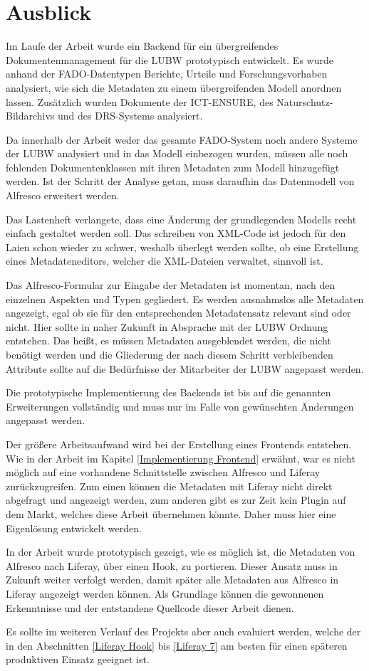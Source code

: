 \section{Ausblick}
Im Laufe der Arbeit wurde ein Backend f\"ur ein \"ubergreifendes Dokumentenmanagement f\"ur die \ac{LUBW} prototypisch entwickelt. 
Es wurde anhand der \ac{FADO}-Datentypen Berichte, Urteile und Forschungsvorhaben analysiert, wie sich die Metadaten zu einem \"ubergreifenden Modell anordnen lassen. Zus\"atzlich wurden Dokumente der \ac{ICT-ENSURE}, des Naturschutz-Bildarchivs und des \ac{DRS}-Systems analysiert.

Da innerhalb der Arbeit weder das gesamte \ac{FADO}-System noch andere Systeme der \ac{LUBW} analysiert und in das Modell einbezogen wurden, m\"ussen alle noch fehlenden Dokumentenklassen mit ihren Metadaten zum Modell hinzugef\"ugt werden. Ist der Schritt der Analyse getan, muss daraufhin das Datenmodell von Alfresco erweitert werden.

Das Lastenheft verlangete, dass eine \"Anderung der grundlegenden Modells recht einfach gestaltet werden soll. Das schreiben von XML-Code ist jedoch f\"ur den Laien schon wieder zu schwer, weshalb \"uberlegt werden sollte, ob eine Erstellung eines Metadateneditors, welcher die XML-Dateien verwaltet, sinnvoll ist.

Das Alfresco-Formular zur Eingabe der Metadaten ist momentan, nach den einzelnen Aspekten und Typen gegliedert. Es werden ausnahmslos alle Metadaten angezeigt, egal ob sie f\"ur den entsprechenden Metadatensatz relevant sind oder nicht. Hier sollte in naher Zukunft in Absprache mit der \ac{LUBW} Ordnung entstehen. Das hei\ss{}t, es m\"ussen Metadaten ausgeblendet werden, die nicht ben\"otigt werden und die Gliederung der nach diesem Schritt verbleibenden Attribute sollte auf die Bed\"urfnisse der Mitarbeiter der \ac{LUBW} angepasst werden.

Die prototypische Implementierung des Backends ist bis auf die genannten Erweiterungen vollst\"andig und muss nur im Falle von gew\"unschten \"Anderungen angepasst werden.

Der gr\"o\ss{}ere Arbeitsaufwand wird bei der Erstellung eines Frontends entstehen. Wie in der Arbeit im Kapitel \ref{Implementierung Frontend} erw\"ahnt, war es nicht m\"oglich auf eine vorhandene Schnittstelle zwischen Alfresco und Liferay zur\"uckzugreifen. Zum einen k\"onnen die Metadaten mit Liferay nicht direkt abgefragt und angezeigt werden, zum anderen gibt es zur Zeit kein Plugin auf dem Markt, welches diese Arbeit \"ubernehmen k\"onnte. Daher muss hier eine Eigenl\"osung entwickelt werden.

In der Arbeit wurde prototypisch gezeigt, wie es m\"oglich ist, die Metadaten von Alfresco nach Liferay, \"uber einen Hook, zu portieren. Dieser Ansatz muss in Zukunft weiter verfolgt werden, damit sp\"ater alle Metadaten aus Alfresco in Liferay angezeigt werden k\"onnen. Als Grundlage k\"onnen die gewonnenen Erkenntnisse und der entstandene Quellcode dieser Arbeit dienen. 

Es sollte im weiteren Verlauf des Projekts aber auch evaluiert werden, welche der in den Abschnitten \ref{Liferay Hook} bis \ref{Liferay 7} am besten f\"ur einen sp\"ateren produktiven Einsatz geeignet ist.

